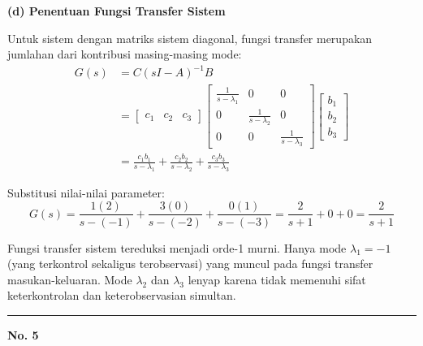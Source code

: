 \documentclass[11pt,a4paper]{article}
\begin{document}
\textbf{(d) Penentuan Fungsi Transfer Sistem}

Untuk sistem dengan matriks sistem diagonal, fungsi transfer merupakan jumlahan dari kontribusi masing-masing mode:
\begin{align*}
    G(s) &= C(sI - A)^{-1} B \\
    &= \begin{bmatrix} c_1 & c_2 & c_3 \end{bmatrix} \begin{bmatrix} \frac{1}{s - \lambda_1} & 0 & 0 \\ 0 & \frac{1}{s - \lambda_2} & 0 \\ 0 & 0 & \frac{1}{s - \lambda_3} \end{bmatrix} \begin{bmatrix} b_1 \\ b_2 \\ b_3 \end{bmatrix} \\
    &= \frac{c_1 b_1}{s - \lambda_1} + \frac{c_2 b_2}{s - \lambda_2} + \frac{c_3 b_3}{s - \lambda_3}
\end{align*}

Substitusi nilai-nilai parameter:
$$G(s) = \frac{1(2)}{s - (-1)} + \frac{3(0)}{s - (-2)} + \frac{0(1)}{s - (-3)} = \frac{2}{s+1} + 0 + 0 = \frac{2}{s+1}$$

Fungsi transfer sistem tereduksi menjadi orde-1 murni. Hanya mode $\lambda_1 = -1$ (yang terkontrol sekaligus terobservasi) yang muncul pada fungsi transfer masukan-keluaran. Mode $\lambda_2$ dan $\lambda_3$ lenyap karena tidak memenuhi sifat keterkontrolan dan keterobservasian simultan.

\vspace{12pt}
\hrule
\vspace{10pt}

\textbf{\large No. 5}
\end{document}
